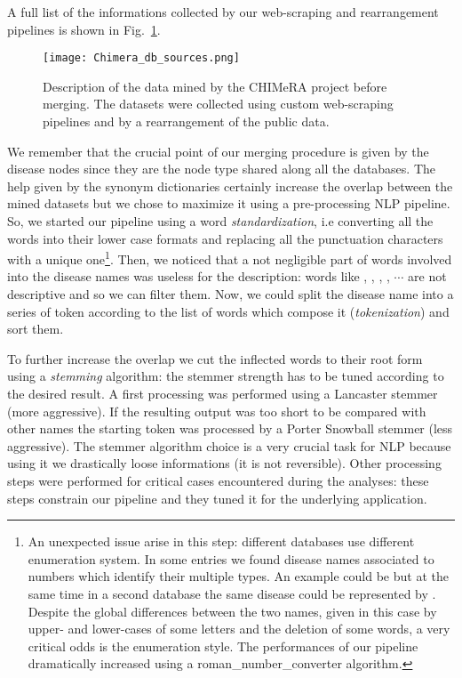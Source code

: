 \documentclass{standalone}
\begin{document}
A full list of the informations collected by our web-scraping and rearrangement pipelines is shown in Fig.~\ref{fig:chimera_data}.

\begin{figure}[htbp]
\centering
\texttt{[image: Chimera\_db\_sources.png]}
\caption{Description of the data mined by the \textsf{CHIMeRA} project before merging.
The datasets were collected using custom web-scraping pipelines and by a rearrangement of the public data.
}
\label{fig:chimera_data}
\end{figure}

We remember that the crucial point of our merging procedure is given by the disease nodes since they are the node type shared along all the databases.
The help given by the synonym dictionaries certainly increase the overlap between the mined datasets but we chose to maximize it using a pre-processing NLP pipeline.
So, we started our pipeline using a word \emph{standardization}, i.e converting all the words into their lower case formats and replacing all the punctuation characters with a unique one\footnote{
  An unexpected issue arise in this step: different databases use different enumeration system.
  In some entries we found disease names associated to numbers which identify their multiple types.
  An example could be  but at the same time in a second database the same disease could be represented by .
  Despite the global differences between the two names, given in this case by upper- and lower-cases of some letters and the deletion of some words, a very critical odds is the enumeration style.
  The performances of our pipeline dramatically increased using a \textsf{roman\_number\_converter} algorithm.
}.
Then, we noticed that a not negligible part of words involved into the disease names was useless for the description: words like , , , , $\cdots$ are not descriptive and so we can filter them.
Now, we could split the disease name into a series of token according to the list of words which compose it (\emph{tokenization}) and sort them.

To further increase the overlap we cut the inflected words to their root form using a \emph{stemming} algorithm: the stemmer strength has to be tuned according to the desired result.
A first processing was performed using a \textsf{Lancaster} stemmer (more aggressive).
If the resulting output was too short to be compared with other names the starting token was processed by a \textsf{Porter Snowball} stemmer (less aggressive).
The stemmer algorithm choice is a very crucial task for NLP because using it we drastically loose informations (it is not reversible).
Other processing steps were performed for critical cases encountered during the analyses: these steps constrain our pipeline and they tuned it for the underlying application.
\end{document}
